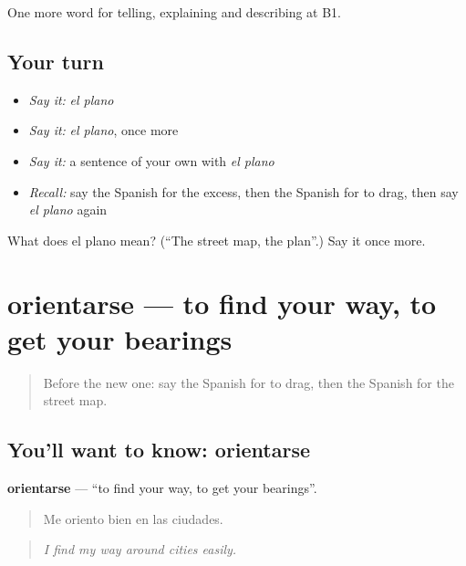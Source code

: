 \begin{grammarlens}[title={What you've built}]
One more word for telling, explaining and describing at B1.
\end{grammarlens}

\subsection*{Your turn}
\begin{itemize}
\raggedright
  \item \emph{Say it:} \emph{el plano}
  \item \emph{Say it:} \emph{el plano}, once more
  \item \emph{Say it:} a sentence of your own with \emph{el plano}
  \item \emph{Recall:} say the Spanish for the excess, then the Spanish for to drag, then say \emph{el plano} again
\end{itemize}

\begin{tcolorbox}[breakable,colback=teal!4,colframe=teal!35!black,title={Before you move on}]
What does el plano mean? (\textquotedblleft{}The street map, the plan\textquotedblright{}.) Say it once more.
\end{tcolorbox}
\section[orientarse]{orientarse — to find your way, to get your bearings}

\label{lesson:ES-C669-orientarse}



\begin{quote}
Before the new one: say the Spanish for to drag, then the Spanish for the street map.
\end{quote}

\subsection*{You'll want to know: orientarse}
\textbf{orientarse} — \textquotedblleft{}to find your way, to get your bearings\textquotedblright{}.

\begin{quote}
Me oriento bien en las ciudades.
\end{quote}

\begin{quote}
\emph{I find my way around cities easily.}
\end{quote}

